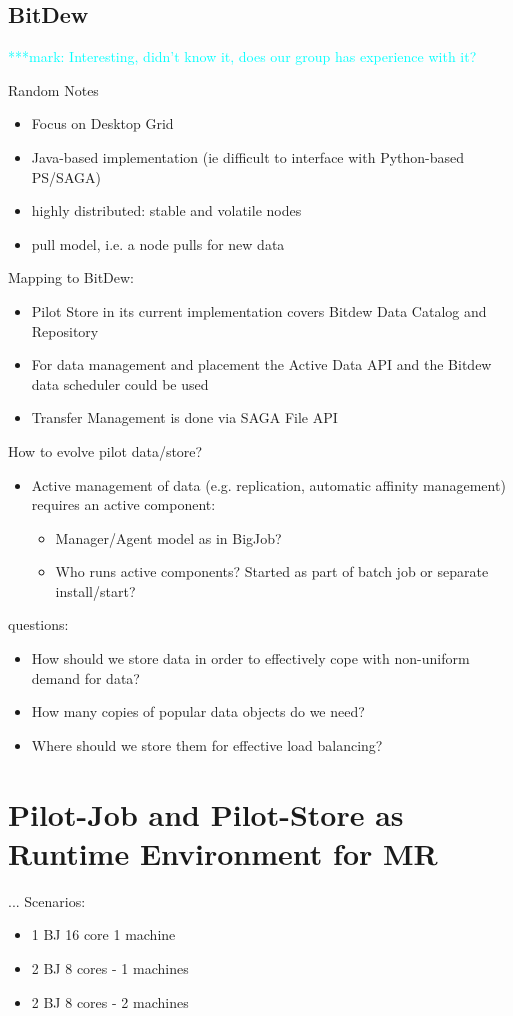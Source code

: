 \documentclass[]{article}
\newcommand{\msnote}[1]{ {\textcolor{cyan} { ***mark: #1 }}}
\begin{document}
\subsection{BitDew}
\msnote{Interesting, didn't know it, does our group has experience with it?}

Random Notes
\begin{itemize}
	\item Focus on Desktop Grid
	\item Java-based implementation (ie difficult to interface with Python-based PS/SAGA)
	\item highly distributed: stable and volatile nodes
	\item pull model, i.e. a node pulls for new data
\end{itemize}


Mapping to BitDew:
\begin{itemize}
	\item Pilot Store in its current implementation covers Bitdew Data Catalog and Repository
	\item For data management and placement the Active Data API and the Bitdew data scheduler could be used
	\item Transfer Management is done via SAGA File API	
\end{itemize}

How to evolve pilot data/store?
\begin{itemize}
	\item Active management of data (e.g. replication, automatic affinity management) requires an active component:
	\begin{itemize}
		\item Manager/Agent model as in BigJob?
		\item Who runs active components? Started as part of batch job or separate install/start?
	\end{itemize}
\end{itemize}

questions:
\begin{itemize}
    \item How should
    we store data in order to effectively cope with non-uniform demand for
    data? 
    \item How many copies of popular data objects do we need? 
    \item Where should we store them for effective load balancing?
\end{itemize}

\section{Pilot-Job and Pilot-Store as Runtime Environment for MR}
...
Scenarios:
\begin{itemize}
	\item 1 BJ 16 core 1 machine
	\item 2 BJ 8 cores - 1 machines
	\item 2 BJ 8 cores - 2 machines
\end{itemize}
\end{document}
